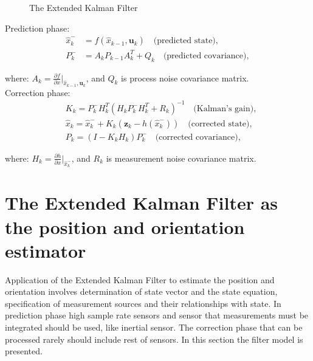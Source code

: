 \begin{figure}[!h]
	\centering
	\caption{The Extended Kalman Filter}
	\label{kf_diagram}
\end{figure}

Prediction phase:
\[
\begin{aligned}
	\hat{x}_k^- & = f(\hat{x}_{k-1}, \bm{u}_k) \quad \text{(predicted state)}, \\
	P_k^- & = A_k P_{k-1} A_k^T + Q_k \quad \text{(predicted covariance)},
\end{aligned}
\]

where: $A_k = \frac{\partial f}{\partial x}\Bigr|_{\hat{x}_{k-1}, \bm{u}_k}$, and $Q_k$ is process noise covariance matrix.\\

Correction phase:
\[
\begin{aligned}
	&K_k = P_k^- H_k^T (H_k P_k^- H_k^T + R_k)^{-1} \quad \text{(Kalman's gain)}, \\
	&\hat{x}_k = \hat{x}_k^- + K_k(\bm{z}_k - h(\hat{x}_k^-)) \quad \text{(corrected state)}, \\
	&P_k = (I - K_k H_k) P_k^- \quad \text{(corrected covariance)},
\end{aligned}
\]

where: $H_k = \frac{\partial h}{\partial x}\Bigr|_{\hat{x}_k^-}$, and $R_k$ is measurement noise covariance matrix.



\section{The  Extended Kalman Filter as the position and orientation estimator}
\label{filter_model}

Application of the Extended Kalman Filter to estimate the position and orientation involves determination of state vector and the state equation, specification of measurement sources and their relationships with state. In prediction phase high sample rate sensors and sensor that measurements must be integrated should be used, like inertial sensor. The correction phase that can be processed rarely should include rest of sensors. In this section the filter model is presented.\\

